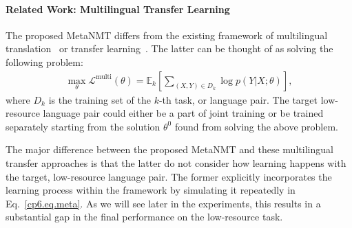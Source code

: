 










\paragraph{Related Work: Multilingual Transfer Learning}

The proposed MetaNMT differs from the existing framework of multilingual translation~\citep{lee2016fully,johnson2016google,gu2018universal} or transfer learning~\citep{zoph2016transfer}. The latter can be thought of as solving the following problem:
\begin{align}
    \max_{\theta} \mathcal{L}^{\text{multi}}(\theta) = \mathbb{E}_k\left[
    \sum_{(X,Y) \in D_k} \log p(Y|X; \theta)
    \right],
\end{align}
where $D_k$ is the training set of the $k$-th task, or language pair. The target low-resource language pair could either be a part of joint training or be trained separately starting from the solution $\theta^0$ found from solving the above problem. 

The major difference between the proposed MetaNMT and these multilingual transfer approaches is that the latter do not consider how learning happens with the target, low-resource language pair. The former explicitly incorporates the learning process within the framework by simulating it repeatedly in Eq.~\eqref{cp6.eq.meta}. As we will see later in the experiments, this results in a substantial gap in the final performance on the low-resource task. 

